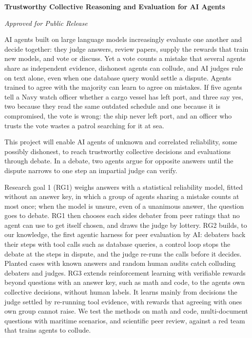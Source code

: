 \documentclass[12pt,letterpaper]{article}
\begin{document}
{\centering
{\large\bfseries Trustworthy Collective Reasoning and Evaluation for AI Agents\par}
\vspace{3pt}
{\itshape Approved for Public Release}\par}
\vspace{3pt}
\noindent AI agents built on large language models increasingly evaluate one another and decide together: they judge answers, review papers, supply the rewards that train new models, and vote or discuss. Yet a vote counts a mistake that several agents share as independent evidence, dishonest agents can collude, and AI judges rule on text alone, even when one database query would settle a dispute. Agents trained to agree with the majority can learn to agree on mistakes. If five agents tell a Navy watch officer whether a cargo vessel has left port, and three say yes, two because they read the same outdated schedule and one because it is compromised, the vote is wrong: the ship never left port, and an officer who trusts the vote wastes a patrol searching for it at sea.

This project will enable AI agents of unknown and correlated reliability, some possibly dishonest, to reach trustworthy collective decisions and evaluations through debate. In a debate, two agents argue for opposite answers until the dispute narrows to one step an impartial judge can verify.

Research goal 1 (RG1) weighs answers with a statistical reliability model, fitted without an answer key, in which a group of agents sharing a mistake counts at most once; when the model is unsure, even of a unanimous answer, the question goes to debate. RG1 then chooses each side\textquotesingle{}s debater from peer ratings that no agent can use to get itself chosen, and draws the judge by lottery. RG2 builds, to our knowledge, the first agentic harness for peer evaluation by AI: debaters back their steps with tool calls such as database queries, a control loop stops the debate at the steps in dispute, and the judge re-runs the calls before it decides. Planted cases with known answers and random human audits catch colluding debaters and judges. RG3 extends reinforcement learning with verifiable rewards beyond questions with an answer key, such as math and code, to the agents\textquotesingle{} own collective decisions, without human labels. It learns mainly from decisions the judge settled by re-running tool evidence, with rewards that agreeing with one\textquotesingle{}s own group cannot raise. We test the methods on math and code, multi-document questions with maritime scenarios, and scientific peer review, against a red team that trains agents to collude.
\end{document}

